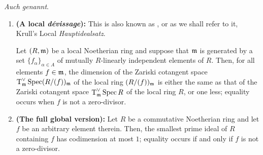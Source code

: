             \begin{lemma} \label{lemma: krull_principal_ideal_theorem} 
                \textit{Auch  genannt}.
                \begin{enumerate}
                    \item \textbf{(A local \textit{d\'evissage}):} This is also known as  \cite[Exercise 12.1.B]{risingsea}, or as we shall refer to it, Krull's Local \textit{Hauptidealsatz}.
                    
                    Let $(R, \mathfrak{m})$ be a local Noetherian ring and suppose that $\mathfrak{m}$ is generated by a set $\{f_{\alpha}\}_{\alpha \in A}$ of mutually $R$-linearly independent elements of $R$. Then, for all elements $f \in \mathfrak{m}$, the dimension of the Zariski cotangent space $\operatorname{T}^{\vee}_{\mathfrak{m}}\operatorname{Spec} (R/(f))_{\mathfrak{m}}$ of the local ring $(R/(f))_{\mathfrak{m}}$ is either the same as that of the Zariski cotangent space $\operatorname{T}^{\vee}_{\mathfrak{m}}\operatorname{Spec} R$ of the local ring $R$, or one less; equality occurs when $f$ is not a zero-divisor.  
                    \item \textbf{(The full global version):} 
                    Let $R$ be a commutative Noetherian ring and let $f$ be an arbitrary element therein. Then, the smallest prime ideal of $R$ containing $f$ has codimension at most $1$; equality occurs if and only if $f$ is not a zero-divisor.
                \end{enumerate}
            \end{lemma}
